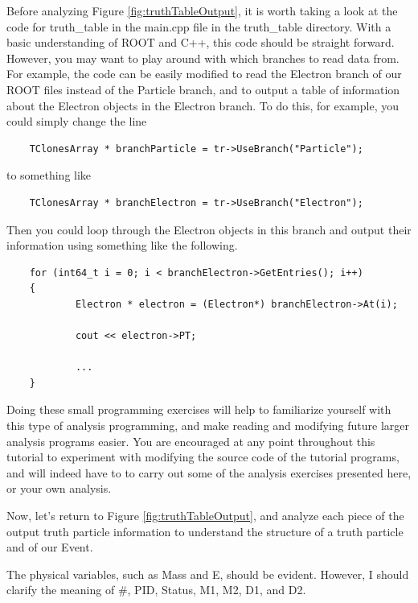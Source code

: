 \documentclass{article}
\begin{document}
\bigskip

Before analyzing Figure \ref{fig:truthTableOutput}, it is worth taking a look at the code for
truth\_table in the main.cpp file in the truth\_table directory. With a basic understanding of
ROOT and C++, this code should be straight forward. However, you may want to play around with
which branches to read data from. For example, the code can be easily modified to read the
Electron branch of our ROOT files instead of the Particle branch, and to output a table of
information about the Electron objects in the Electron branch. To do this, for example, you
could simply change the line

\begin{verbatim}
	TClonesArray * branchParticle = tr->UseBranch("Particle");
\end{verbatim}

to something like

\begin{verbatim}
	TClonesArray * branchElectron = tr->UseBranch("Electron");
\end{verbatim}

Then you could loop through the Electron objects in this branch and output their information
using something like the following.

\begin{verbatim}
	for (int64_t i = 0; i < branchElectron->GetEntries(); i++)
	{
	        Electron * electron = (Electron*) branchElectron->At(i);

	        cout << electron->PT;

	        ...
	}
\end{verbatim}

Doing these small programming exercises will help to familiarize yourself with this type of
analysis programming, and make reading and modifying future larger analysis programs easier.
You are encouraged at any point throughout this tutorial to experiment with modifying the source
code of the tutorial programs, and will indeed have to to carry out some of the analysis exercises
presented here, or your own analysis.

\bigskip

Now, let's return to Figure \ref{fig:truthTableOutput}, and analyze each piece of the output truth
particle information to understand the structure of a truth particle and of our Event.

\bigskip

The physical variables, such as Mass and E, should be evident. However, I should clarify the
meaning of \#, PID, Status, M1, M2, D1, and D2.
\end{document}
